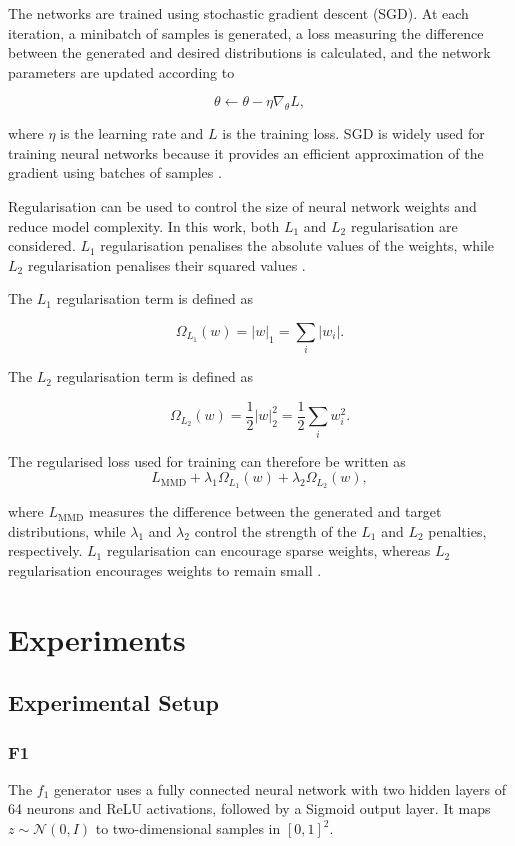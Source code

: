 \documentclass[conference,a4paper]{IEEEtran}
\begin{document}
The networks are trained using stochastic gradient descent (SGD). At each iteration, a minibatch of samples is generated, a loss measuring the difference between the generated and desired distributions is calculated, and the network parameters are updated according to

\begin{equation}
	\theta \leftarrow \theta - \eta \nabla_\theta L,
\end{equation}

where $\eta$ is the learning rate and $L$ is the training loss. SGD is widely used for training neural networks because it provides an efficient approximation of the gradient using batches of samples \cite{goodfellow2016}.

Regularisation can be used to control the size of neural network weights and reduce model complexity. In this work, both $L_1$ and $L_2$ regularisation are considered. $L_1$ regularisation penalises the absolute values of the weights, while $L_2$ regularisation penalises their squared values \cite{goodfellow2016}.

The $L_1$ regularisation term is defined as

\[
\Omega_{L_1}(w) = |w|_1 = \sum_i |w_i|.
\]

The $L_2$ regularisation term is defined as

\[
\Omega_{L_2}(w) = \frac{1}{2}|w|_2^2
= \frac{1}{2}\sum_i w_i^2.
\]

The regularised loss used for training can therefore be written as
\[
L_{\mathrm{MMD}}
+
\lambda_1 \Omega_{L_1}(w)
+
\lambda_2 \Omega_{L_2}(w),
\]

where $L_{\mathrm{MMD}}$ measures the difference between the generated and target distributions, while $\lambda_1$ and $\lambda_2$ control the strength of the $L_1$ and $L_2$ penalties, respectively. $L_1$ regularisation can encourage sparse weights, whereas $L_2$ regularisation encourages weights to remain small \cite{goodfellow2016}.


\section{Experiments}

\subsection{Experimental Setup}
\subsubsection{F1}
The $f_1$ generator uses a fully connected neural network with two hidden layers of 64 neurons and ReLU activations, followed by a Sigmoid output layer. It maps $z\sim\mathcal{N}(0,I)$ to two-dimensional samples in $[0,1]^2$.
\end{document}
